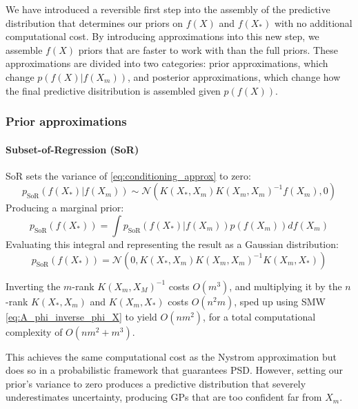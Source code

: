 We have introduced a reversible first step into the assembly of the predictive distribution that determines our priors on $f(X)$ and $f(X_*)$ with no additional computational cost. By introducing approximations into this new step, we assemble $f(X)$ priors that are faster to work with than the full priors. These approximations are divided into two categories: prior approximations, which change $p(f(X) | f(X_m))$, and posterior approximations, which change how the final predictive disitribution is assembled given $p(f(X))$.

\subsubsection{Prior approximations}

\paragraph{Subset-of-Regression (SoR) \cite{sor}}
SoR sets the variance of \ref{eq:conditioning_approx} to zero:
\begin{equation*}
    p_{\text{SoR}}(f(X_*) | f(X_m)) \sim \mathcal{N} (
    K(X_*, X_m) K(X_m, X_m)^{-1} f(X_m),
    0
    )
\end{equation*}
Producing a marginal prior:
\begin{equation*}
    p_{\text{SoR}}(f(X_*)) = \int p_{\text{SoR}}(f(X_*) | f(X_m)) p(f(X_m)) df(X_m)
\end{equation*}
Evaluating this integral and representing the result as a Gaussian distribution:
\begin{equation*}
    p_{\text{SoR}}(f(X_*)) = \mathcal{N}(
    0, 
    K(X_*, X_m) K(X_m, X_m)^{-1} K(X_m, X_*)
    )
\end{equation*}

Inverting the $m$-rank $K(X_m, X_M)^{-1}$ costs $O(m^3)$, and multiplying it by the $n$-rank $K(X_*, X_m)$ and $K(X_m, X_*)$ costs $O(n^2m)$, sped up using SMW \ref{eq:A_phi_inverse_phi_X} to yield $O(nm^2)$, for a total computational complexity of $O(nm^2 + m^3)$.

This achieves the same computational cost as the Nystrom approximation but does so in a probabilistic framework that guarantees PSD. However, setting our prior's variance to zero produces a predictive distribution that severely underestimates uncertainty, producing GPs that are too confident far from $X_m$.

